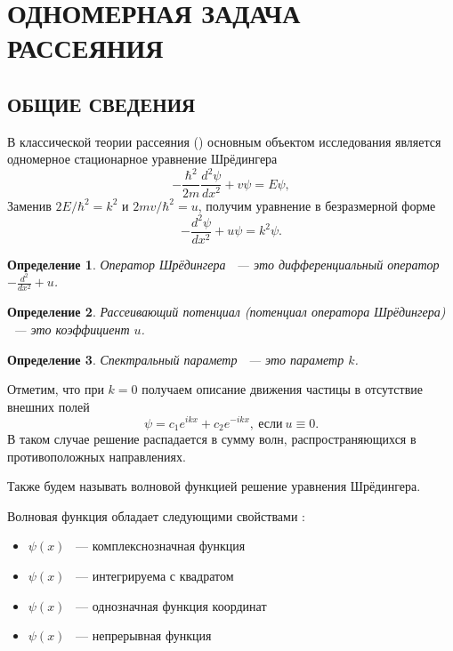 \documentclass[a4 paper, 12 pt]{extarticle}
\newtheorem{Def}{Определение}[section]
\begin{document}
	
	\newpage
	\section{ОДНОМЕРНАЯ ЗАДАЧА РАССЕЯНИЯ}
	\subsection{ОБЩИЕ СВЕДЕНИЯ}
	В классической теории рассеяния (\cite{Landau, Soliton, SMatrix})
	основным объектом исследования является одномерное стационарное уравнение Шрёдингера
   \begin{equation*}
   -\frac{\hbar^2}{2m}\frac{d^2\psi}{d x^2}+v\psi=E\psi,
   \end{equation*}
   Заменив $2E/\hbar^2=k^2$ и $2mv/\hbar^2=u$, получим уравнение в безразмерной форме
   \begin{equation}\label{Schred1D}
   -\frac{d^2\psi}{d x^2}+u\psi=k^2\psi.
   \end{equation}
   
   \begin{Def}
   	Оператор Шрёдингера ~--- это дифференциальный оператор \newline  $-\frac{d^2}{d x^2}+u$.
   \end{Def}

   \begin{Def}
   	Рассеивающий потенциал (потенциал оператора Шрёдингера) ~--- это коэффициент $u$.
   \end{Def}

   \begin{Def}
    Спектральный параметр ~--- это параметр $k$.
   \end{Def}
	Отметим, что при $k=0$ получаем описание движения частицы в отсутствие внешних полей
	\begin{equation*}
	\psi=c_1e^{ikx}+c_2e^{-ikx}, \ \text{если} \ u\equiv0.
	\end{equation*}
	В таком случае решение распадается в сумму волн, распространяющихся в противоположных направлениях.
	
    Также будем называть волновой функцией решение уравнения Шрёдингера.
    
    Волновая функция обладает следующими свойствами \cite{Landau, Peisakhovich}:
    \begin{itemize}
    	\item $\psi\left(x\right)$ ~--- комплекснозначная функция
    	\item $\psi\left(x\right)$ ~--- интегрируема с квадратом
    	\item $\psi\left(x\right)$ ~--- однозначная функция координат
    	\item $\psi\left(x\right)$ ~--- непрерывная функция
    \end{itemize}
\end{document}
